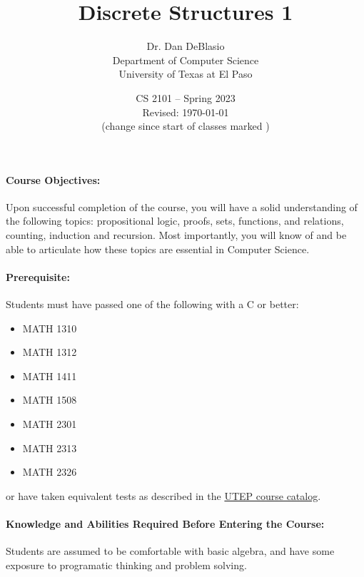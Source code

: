 \documentclass[12pt]{scrartcl}
\title{Discrete Structures 1}\let\Title\@title
\subtitle{
{\small
Dr. Dan DeBlasio\\
Department of Computer Science\\
University of Texas at El Paso\\
}
\vskip-1cm}
\date{\small CS 2101 -- Spring 2023\\ \vspace{1em}Revised: \today\\(change since start of classes marked \change{}{in orange})}
\begin{document}

\maketitle
%
%
\paragraph{Course Objectives:} Upon successful completion of the course, you will have a solid understanding of the following topics: propositional logic, proofs, sets, functions, and relations, counting, induction and recursion. Most importantly, you will know of and be able to articulate how these topics are essential in Computer Science.

\paragraph{Prerequisite:} Students must have passed one of the following with a C or better:
\begin{multicols}{4}
\begin{itemize}
\item MATH 1310
\item MATH 1312
\item MATH 1411
\item MATH 1508
\item MATH 2301
\item MATH 2313
\item MATH 2326
\end{itemize}
\end{multicols}
or have taken equivalent tests as described in the \href{http://catalog.utep.edu/search/?search=CS+2101}{UTEP course catalog}. 

\paragraph{Knowledge and Abilities Required Before Entering the Course:} Students are assumed to be comfortable with basic algebra, and have some exposure to programatic thinking and problem solving. 
\end{document}

